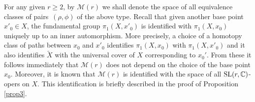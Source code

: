 \documentclass[10pt,a4paper]{amsart}
\numberwithin{equation}{section}
\begin{document}
For any given $r \geq 2$, by ${\mathcal M}(r)$ we shall denote the space of all equivalence
classes of pairs~$(\rho, \phi)$ of the above type.
Recall that given another base point
$x'_0 \in X$, the fundamental group $\pi_1(X, x'_0)$ is identified with
$\pi_1(X, x_0)$ uniquely up to an inner automorphism. More precisely, a choice of
a homotopy class of paths between $x_0$ and $x'_0$ identifies $\pi_1(X, x_0)$
with $\pi_1(X, x'_0)$ and it also identifies $\widetilde{X}$ with the universal cover of $X$
corresponding to $x_0'$. From these it follows immediately
that ${\mathcal M}(r)$ does not depend on the choice of the base point $x_0$.
Moreover, it is known that ${\mathcal M}(r)$ is identified with the space of all ${\rm SL}(r,
{\mathbb C})$-opers on $X$. This identification is briefly described in the proof
of Proposition \ref{prop3}.
\end{document}
